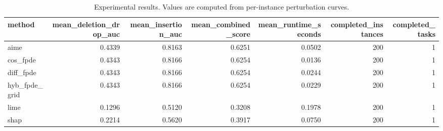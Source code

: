 \begin{table}[t]
\caption{Experimental results. Values are computed from per-instance perturbation curves.}
\label{tab:main_results_computed}
\centering
\begin{tabular}{lrrrrrr}
\toprule
method & mean\_deletion\_drop\_auc & mean\_insertion\_auc & mean\_combined\_score & mean\_runtime\_seconds & completed\_instances & completed\_tasks \\
\midrule
aime & 0.4339 & 0.8163 & 0.6251 & 0.0502 & 200 & 1 \\
cos\_fpde & 0.4343 & 0.8166 & 0.6254 & 0.0136 & 200 & 1 \\
diff\_fpde & 0.4343 & 0.8166 & 0.6254 & 0.0244 & 200 & 1 \\
hyb\_fpde\_grid & 0.4343 & 0.8166 & 0.6254 & 0.0229 & 200 & 1 \\
lime & 0.1296 & 0.5120 & 0.3208 & 0.1978 & 200 & 1 \\
shap & 0.2214 & 0.5620 & 0.3917 & 0.0750 & 200 & 1 \\
\bottomrule
\end{tabular}

\end{table}

